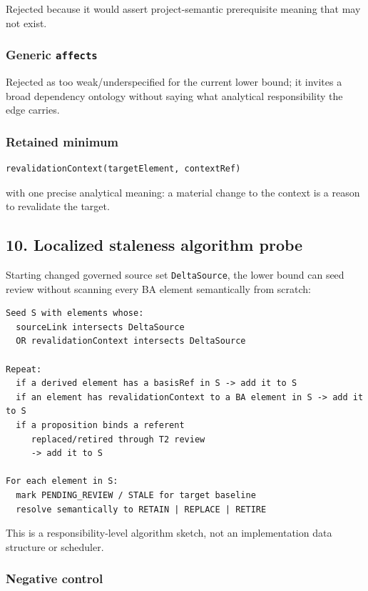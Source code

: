 \documentclass[11pt,a4paper]{article}
\begin{document}
Rejected because it would assert project-semantic prerequisite meaning
that may not exist.

\subsubsection{\texorpdfstring{Generic
\texttt{affects}}{Generic affects}}\label{generic-affects}

Rejected as too weak/underspecified for the current lower bound; it
invites a broad dependency ontology without saying what analytical
responsibility the edge carries.

\subsubsection{Retained minimum}\label{retained-minimum}

\begin{verbatim}
revalidationContext(targetElement, contextRef)
\end{verbatim}

with one precise analytical meaning: a material change to the context is
a reason to revalidate the target.

\subsection{10. Localized staleness algorithm
probe}\label{localized-staleness-algorithm-probe}

Starting changed governed source set \texttt{DeltaSource}, the lower
bound can seed review without scanning every BA element semantically
from scratch:

\begin{verbatim}
Seed S with elements whose:
  sourceLink intersects DeltaSource
  OR revalidationContext intersects DeltaSource

Repeat:
  if a derived element has a basisRef in S -> add it to S
  if an element has revalidationContext to a BA element in S -> add it to S
  if a proposition binds a referent
     replaced/retired through T2 review
     -> add it to S

For each element in S:
  mark PENDING_REVIEW / STALE for target baseline
  resolve semantically to RETAIN | REPLACE | RETIRE
\end{verbatim}

This is a responsibility-level algorithm sketch, not an implementation
data structure or scheduler.

\subsubsection{Negative control}\label{negative-control}
\end{document}
